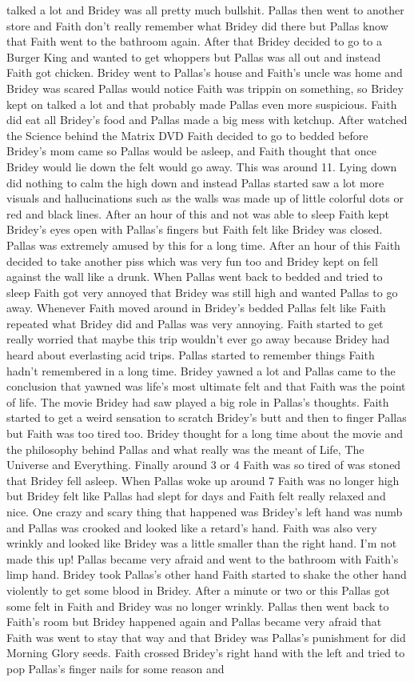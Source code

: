 \documentclass[12pt]{book}
\begin{document}
talked a lot and Bridey was all pretty much bullshit. Pallas then went to another store and Faith don't really remember what Bridey did there but Pallas know that Faith went to the bathroom again. After that Bridey decided to go to a Burger King and wanted to get whoppers but Pallas was all out and instead Faith got chicken. Bridey went to Pallas's house and Faith's uncle was home and Bridey was scared Pallas would notice Faith was trippin on something, so Bridey kept on talked a lot and that probably made Pallas even more suspicious. Faith did eat all Bridey's food and Pallas made a big mess with ketchup. After watched the Science behind the Matrix DVD Faith decided to go to bedded before Bridey's mom came so Pallas would be asleep, and Faith thought that once Bridey would lie down the felt would go away. This was around 11. Lying down did nothing to calm the high down and instead Pallas started saw a lot more visuals and hallucinations such as the walls was made up of little colorful dots or red and black lines. After an hour of this and not was able to sleep Faith kept Bridey's eyes open with Pallas's fingers but Faith felt like Bridey was closed. Pallas was extremely amused by this for a long time. After an hour of this Faith decided to take another piss which was very fun too and Bridey kept on fell against the wall like a drunk. When Pallas went back to bedded and tried to sleep Faith got very annoyed that Bridey was still high and wanted Pallas to go away. Whenever Faith moved around in Bridey's bedded Pallas felt like Faith repeated what Bridey did and Pallas was very annoying. Faith started to get really worried that maybe this trip wouldn't ever go away because Bridey had heard about everlasting acid trips. Pallas started to remember things Faith hadn't remembered in a long time. Bridey yawned a lot and Pallas came to the conclusion that yawned was life's most ultimate felt and that Faith was the point of life. The movie Bridey had saw played a big role in Pallas's thoughts. Faith started to get a weird sensation to scratch Bridey's butt and then to finger Pallas but Faith was too tired too. Bridey thought for a long time about the movie and the philosophy behind Pallas and what really was the meant of Life, The Universe and Everything. Finally around 3 or 4 Faith was so tired of was stoned that Bridey fell asleep. When Pallas woke up around 7 Faith was no longer high but Bridey felt like Pallas had slept for days and Faith felt really relaxed and nice. One crazy and scary thing that happened was Bridey's left hand was numb and Pallas was crooked and looked like a retard's hand. Faith was also very wrinkly and looked like Bridey was a little smaller than the right hand. I'm not made this up! Pallas became very afraid and went to the bathroom with Faith's limp hand. Bridey took Pallas's other hand Faith started to shake the other hand violently to get some blood in Bridey. After a minute or two or this Pallas got some felt in Faith and Bridey was no longer wrinkly. Pallas then went back to Faith's room but Bridey happened again and Pallas became very afraid that Faith was went to stay that way and that Bridey was Pallas's punishment for did Morning Glory seeds. Faith crossed Bridey's right hand with the left and tried to pop Pallas's finger nails for some reason and 
\end{document}
